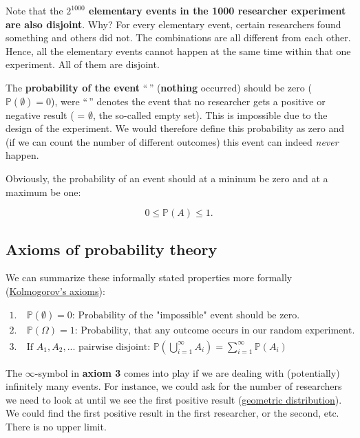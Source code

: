 \documentclass[
]{book}
\begin{document}
Note that the \textbf{\(2^{1000}\) elementary events in the 1000 researcher experiment are also disjoint}. Why? For every elementary event,
certain researchers found something and others did not. The combinations are all different from each other. Hence,
all the elementary events cannot happen at the same time within that one experiment. All of them are disjoint.

The \textbf{probability of the event} ``\,'' (\textbf{nothing} occurred) should be zero (\(\mathbb{P}(\emptyset)=0\)), were ``\,'' denotes
the event that no researcher gets a positive or negative result ( = \(\emptyset\), the so-called empty set).
This is impossible due to the design of the experiment.
We would therefore define this probability as zero and (if we can count the number of different outcomes)
this event can indeed \emph{never} happen.

Obviously, the probability of an event should at a mininum be zero and at a maximum be one:

\[0 \le \mathbb{P}(A) \le 1.\]

\subsection{Axioms of probability theory}\label{axioms_of_probability_theory}

We can summarize these informally stated properties more formally (\href{https://altexploit.wordpress.com/wp-content/uploads/2017/07/a-n-kolmogorov-foundations-of-the-theory-of-probability-chelsea-pub-co-1960.pdf}{Kolmogorov's axioms}):

\begin{align}
1. &\ \mathbb{P}(\emptyset) = 0 \text{: Probability of the "impossible" event should be zero.}\\
2. &\ \mathbb{P}(\Omega) = 1 \text{: Probability, that any outcome occurs in our random experiment.}\\
3. &\ \text{If } A_1, A_2,... \text{ pairwise disjoint: } \mathbb{P}\left(\bigcup_{i=1}^{\infty} A_i\right) = \sum_{i=1}^{\infty} \mathbb{P}(A_i)
\end{align}

The \(\infty\)-symbol in \textbf{axiom 3} comes into play if we are dealing with (potentially) infinitely many events.
For instance, we could ask for the number of researchers we need to look at until we see the first
positive result (\href{https://en.wikipedia.org/wiki/Geometric_distribution}{geometric distribution}).
We could find the first positive result in the first researcher, or the second, etc. There is no upper limit.
\end{document}

